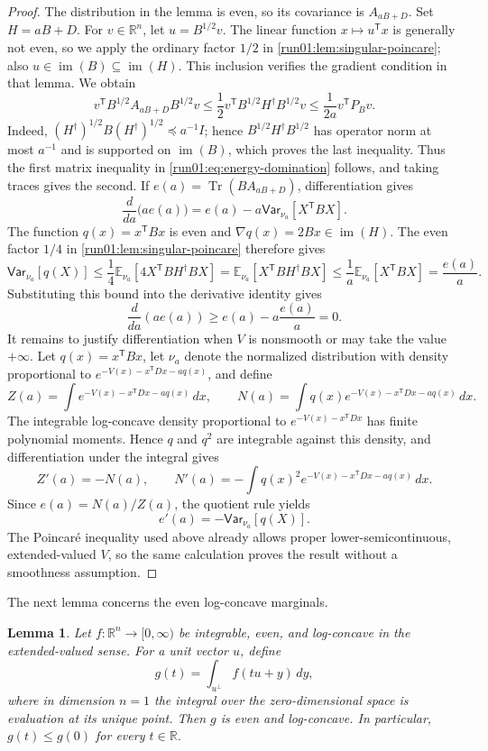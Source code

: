 \documentclass[11pt]{article}
\numberwithin{equation}{section}
\newtheorem{lemma}{Lemma}[section]
\theoremstyle{definition}
\newcommand{\E}[2]{\mathbb{E}_{#1}\left[#2\right]}
\newcommand{\V}[2]{\mathsf{Var}_{#1}\left[#2\right]}
\begin{document}
\begin{proof}
The distribution in the lemma is even, so its covariance is $A_{aB+D}$.
Set $H=aB+D$.
For $v\in\mathbb R^n$, let
$u=B^{1/2}v$.
The linear function $x\mapsto u^{\mathsf T}x$ is generally not even, so we apply
the ordinary factor
$1/2$ in \cref{run01:lem:singular-poincare}; also
$u\in\operatorname{im}(B)\subseteq\operatorname{im}(H)$.
This inclusion verifies the gradient condition in that lemma.
We obtain
\[
v^{\mathsf T}B^{1/2}A_{aB+D}B^{1/2}v
\leq \frac12v^{\mathsf T}B^{1/2}H^\dagger B^{1/2}v
\leq \frac1{2a}v^{\mathsf T}P_Bv.
\]
Indeed, $(H^\dagger)^{1/2}B(H^\dagger)^{1/2}\preceq a^{-1}I$; hence
$B^{1/2}H^\dagger B^{1/2}$ has operator norm at most
$a^{-1}$ and is supported on
$\operatorname{im}(B)$, which proves the last inequality.
Thus the first matrix inequality in \cref{run01:eq:energy-domination} follows,
and taking traces gives the second.
If $e(a)=\operatorname{Tr}(BA_{aB+D})$, differentiation gives
\[
 \frac{d}{da}\bigl(ae(a)\bigr)
 =e(a)-a\V{\nu_a}{X^{\mathsf T} BX}.
\]
The function $q(x)=x^{\mathsf T}Bx$ is even and
$\nabla q(x)=2Bx\in\operatorname{im}(H)$.
The even factor $1/4$ in \cref{run01:lem:singular-poincare} therefore gives
\[
\V{\nu_a}{q(X)}
\leq \frac14\E{\nu_a}{4X^{\mathsf T}BH^\dagger BX}
=\E{\nu_a}{X^{\mathsf T}BH^\dagger BX}
\leq \frac1a\E{\nu_a}{X^{\mathsf T}BX}
=\frac{e(a)}a.
\]
Substituting this bound into the derivative identity gives
\[
\frac{d}{da}(ae(a))
\geq e(a)-a\frac{e(a)}a
=0.
\]
It remains to justify differentiation when $V$ is nonsmooth or may take the
value
$+\infty$.
Let $q(x)=x^{\mathsf T}Bx$, let
$\nu_a$ denote the normalized distribution with density proportional to
$e^{-V(x)-x^{\mathsf T}Dx-aq(x)}$, and define
\[
Z(a)=\int e^{-V(x)-x^{\mathsf T}Dx-aq(x)}\,dx,
\qquad
N(a)=\int q(x)e^{-V(x)-x^{\mathsf T}Dx-aq(x)}\,dx.
\]
The integrable log-concave density proportional to $e^{-V(x)-x^{\mathsf T}Dx}$
has finite polynomial moments.
Hence $q$ and
$q^2$ are integrable against this density, and differentiation under the
integral gives
\[
Z'(a)=-N(a),
\qquad
N'(a)=-\int q(x)^2e^{-V(x)-x^{\mathsf T}Dx-aq(x)}\,dx.
\]
Since $e(a)=N(a)/Z(a)$, the quotient rule yields
\[
 e'(a)=-\V{\nu_a}{q(X)}.
\]
The Poincar\'e inequality used above already allows proper lower-semicontinuous,
extended-valued $V$, so the same calculation proves the result without a
smoothness assumption.
\end{proof}
\space The next lemma concerns the even log-concave marginals.

\begin{lemma}
\label{run01:lem:marginal-peak}
Let $f:\mathbb R^n\to[0,\infty)$ be integrable, even, and log-concave in the
extended-valued sense.
For a unit vector $u$, define
\[
 g(t)=\int_{u^\perp} f(tu+y)\,dy,
\]
where in dimension $n=1$ the integral over the zero-dimensional space is
evaluation at its unique point.
Then $g$ is even and log-concave.
In particular, $g(t)\leq g(0)$ for every
$t\in\mathbb R$.
\end{lemma}
\end{document}

